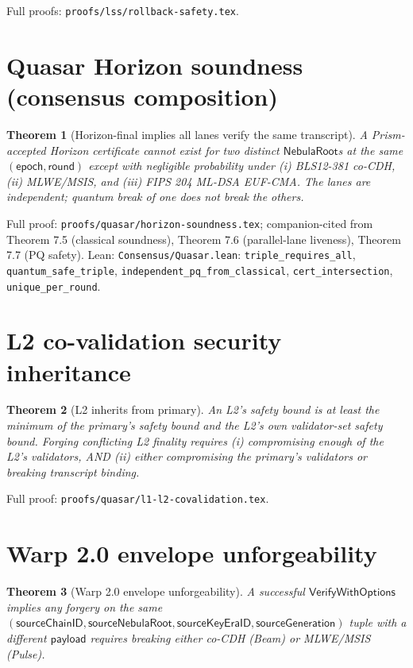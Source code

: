 \documentclass[11pt,a4paper]{article}
\newtheorem{theorem}{Theorem}
\begin{document}
Full proofs: \texttt{proofs/lss/rollback-safety.tex}.

\section{Quasar Horizon soundness (consensus composition)}

\begin{theorem}[Horizon-final implies all lanes verify the same transcript]
A Prism-accepted Horizon certificate cannot exist for two distinct $\mathsf{NebulaRoot}$s at the same $(\mathsf{epoch}, \mathsf{round})$ except with negligible probability under (i) BLS12-381 co-CDH, (ii) MLWE/MSIS, and (iii) FIPS 204 ML-DSA EUF-CMA. The lanes are independent; quantum break of one does not break the others.
\end{theorem}

Full proof: \texttt{proofs/quasar/horizon-soundness.tex}; companion-cited from \cite{quasarcertsoundness} Theorem 7.5 (classical soundness), Theorem 7.6 (parallel-lane liveness), Theorem 7.7 (PQ safety). Lean: \texttt{Consensus/Quasar.lean}: \texttt{triple\_requires\_all}, \texttt{quantum\_safe\_triple}, \texttt{independent\_pq\_from\_classical}, \texttt{cert\_intersection}, \texttt{unique\_per\_round}.

\section{L2 co-validation security inheritance}

\begin{theorem}[L2 inherits from primary]
An L2's safety bound is at least the minimum of the primary's safety bound and the L2's own validator-set safety bound. Forging conflicting L2 finality requires (i) compromising enough of the L2's validators, AND (ii) either compromising the primary's validators or breaking transcript binding.
\end{theorem}

Full proof: \texttt{proofs/quasar/l1-l2-covalidation.tex}.

\section{Warp 2.0 envelope unforgeability}

\begin{theorem}[Warp 2.0 envelope unforgeability]
A successful $\mathsf{VerifyWithOptions}$ implies any forgery on the same $(\mathsf{sourceChainID}, \mathsf{sourceNebulaRoot}, \mathsf{sourceKeyEraID}, \mathsf{sourceGeneration})$ tuple with a different $\mathsf{payload}$ requires breaking either co-CDH (Beam) or MLWE/MSIS (Pulse).
\end{theorem}
\end{document}
